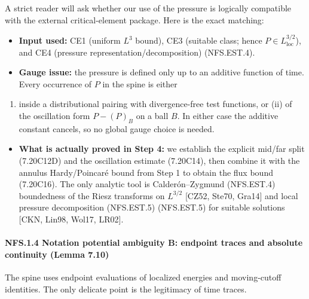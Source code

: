\documentclass[
  11pt,
]{article}
\providecommand{\tightlist}{%
  \setlength{\itemsep}{0pt}\setlength{\parskip}{0pt}}
\begin{document}
A strict reader will ask whether our use of the pressure is logically compatible with the external critical-element package. Here is the exact matching:

\begin{itemize}
\tightlist
\item
  \textbf{Input used:} CE1 (uniform \(L^3\) bound), CE3 (suitable class; hence \(P\in L^{3/2}_{\mathrm{loc}}\)), and CE4 (pressure representation/decomposition) (NFS.EST.4).
\item
  \textbf{Gauge issue:} the pressure is defined only up to an additive function of time. Every occurrence of \(P\) in the spine is either
\end{itemize}

\begin{enumerate}
\def\labelenumi{(\roman{enumi})}
\tightlist
\item
  inside a distributional pairing with divergence-free test functions, or (ii) of the oscillation form \(P-(P)_B\) on a ball \(B\). In either case the additive constant cancels, so no global gauge choice is needed.
\end{enumerate}

\begin{itemize}
\tightlist
\item
  \textbf{What is actually proved in Step 4:} we establish the explicit mid/far split (7.20C12D) and the oscillation estimate (7.20C14), then combine it with the annulus Hardy/Poincaré bound from Step 1 to obtain the flux bound (7.20C16). The only analytic tool is Calderón--Zygmund (NFS.EST.4) boundedness of the Riesz transforms on \(L^{3/2}\) {[}CZ52, Ste70, Gra14{]} and local pressure decomposition (NFS.EST.5) (NFS.EST.5) for suitable solutions {[}CKN, Lin98, Wol17, LR02{]}.
\end{itemize}

\hypertarget{nfs.1.4-notation-potential-ambiguity-b-endpoint-traces-and-absolute-continuity-lemma-7.10}{%
\paragraph{NFS.1.4 Notation potential ambiguity B: endpoint traces and absolute continuity (Lemma 7.10)}\label{nfs.1.4-notation-potential-ambiguity-b-endpoint-traces-and-absolute-continuity-lemma-7.10}}

The spine uses endpoint evaluations of localized energies and moving-cutoff identities. The only delicate point is the legitimacy of time traces.
\end{document}
